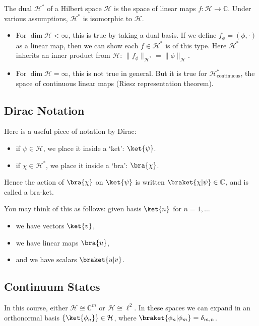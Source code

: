 \documentclass[12pt]{article}
\begin{document}
The dual $\mathcal{H}^{\ast}$ of a Hilbert space $\mathcal{H}$ is the space of linear maps $f : \mathcal{H} \to \mathbb{C}$. Under various assumptions, $\mathcal{H}^{\ast}$ is isomorphic to $\mathcal{H}$.

\begin{itemize}
	\item For $\dim \mathcal{H} < \infty$, this is true by taking a dual basis. If we define $f_\phi = (\phi, \cdot)$ as a linear map, then we can show each $f \in \mathcal{H}^{\ast}$ is of this type. Here $\mathcal{H}^{\ast}$ inherits an inner product from $\mathcal{H}$: $\|f_\phi\|_{\mathcal{H}^{\ast}} = \|\phi\|_{\mathcal{H}}$.
	\item For $\dim \mathcal{H} = \infty$, this is not true in general. But it is true for $\mathcal{H}^{\ast}_{\text{continuous}}$, the space of continuous linear maps (Riesz representation theorem).
\end{itemize}

\subsection{Dirac Notation}
\label{sub:dirac_not}

Here is a useful piece of notation by Dirac:
\begin{itemize}
	\item if $\psi \in \mathcal{H}$, we place it inside a `ket': $\ket{\psi}$.
	\item if $\chi \in \mathcal{H}^{\ast}$, we place it inside a `bra': $\bra{\chi}$.
\end{itemize}
Hence the action of $\bra{\chi}$ on $\ket{\psi}$ is written $\braket{\chi|\psi} \in \mathbb{C}$, and is called a bra-ket.

You may think of this as follows: given basis $\ket{n}$ for  $n = 1, \ldots$
\begin{itemize}
	 \item we have vectors $\ket{v}$,
	 \item we have linear maps $\bra{u}$,
	 \item and we have scalars $\braket{u|v}$.
\end{itemize}


\subsection{Continuum States}
\label{sub:continuum}

In this course, either $\mathcal{H} \cong \mathbb{C}^{m}$ or $\mathcal{H} \cong \ell^2$. In these spaces we can expand in an orthonormal basis $\{\ket{\phi_n}\} \in \mathcal{H}$, where $\braket{\phi_n|\phi_m} = \delta_{m,n}$.
\end{document}
